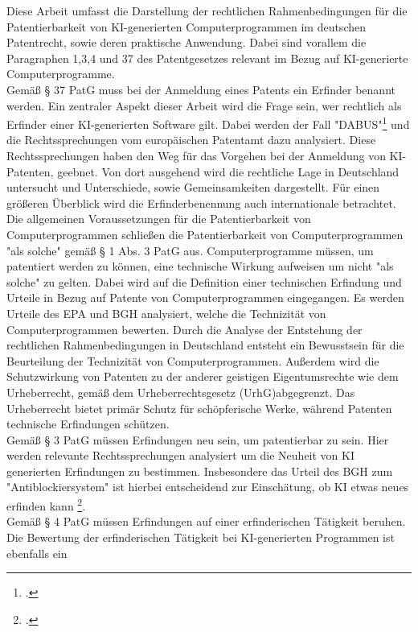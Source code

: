 Diese Arbeit umfasst die Darstellung der rechtlichen
Rahmenbedingungen für die Patentierbarkeit von KI-generierten
Computerprogrammen im deutschen Patentrecht, sowie deren
praktische Anwendung.
Dabei sind vorallem die Paragraphen 1,3,4 und 37 des Patentgesetzes relevant
im Bezug auf KI-generierte Computerprogramme.
\\
Gemäß § 37 PatG muss bei der Anmeldung eines Patents 
ein Erfinder benannt werden. 
Ein zentraler Aspekt dieser Arbeit wird die Frage sein, 
wer rechtlich als Erfinder einer KI-generierten Software gilt. 
Dabei werden der Fall "DABUS"\footcite{zivilsenatZB222024} und die Rechtssprechungen
vom europäischen Patentamt dazu analysiert. Diese Rechtssprechungen
haben den Weg für das Vorgehen bei der Anmeldung von KI-Patenten, geebnet. 
Von dort ausgehend 
wird die rechtliche Lage in Deutschland untersucht und
Unterschiede, sowie Gemeinsamkeiten dargestellt. Für einen größeren Überblick
wird die Erfinderbenennung auch internationale
betrachtet.
\\
Die allgemeinen Voraussetzungen 
für die Patentierbarkeit von Computerprogrammen
schließen die Patentierbarkeit von Computerprogrammen "als solche" 
gemäß § 1 Abs. 3 PatG aus. 
Computerprogramme müssen, um patentiert werden zu können,
eine technische Wirkung aufweisen um nicht "als solche" zu gelten.
Dabei wird auf die Definition einer technischen Erfindung und Urteile
in Bezug auf Patente von Computerprogrammen eingegangen. Es
werden Urteile des EPA und BGH analysiert, welche
die Technizität von Computerprogrammen bewerten.
Durch die Analyse der Entstehung der rechtlichen Rahmenbedingungen
in Deutschland entsteht ein Bewusstsein für die 
Beurteilung der Technizität von Computerprogrammen.
Außerdem wird die Schutzwirkung von Patenten  
zu der anderer geistigen Eigentumsrechte wie dem Urheberrecht, 
gemäß dem Urheberrechtsgesetz (UrhG)abgegrenzt.
Das Urheberrecht bietet primär Schutz für schöpferische Werke,
während Patenten technische Erfindungen schützen.
\\
Gemäß § 3 PatG müssen Erfindungen neu sein, 
um patentierbar zu sein. 
Hier werden relevante Rechtssprechungen 
analysiert um die Neuheit von KI generierten
Erfindungen zu bestimmen. Insbesondere das
Urteil des BGH zum "Antiblockiersystem" ist 
hierbei entscheidend zur Einschätung, ob KI
etwas neues erfinden kann \footcite{Bundesgerichtshof13051980}.
\\
Gemäß § 4 PatG müssen Erfindungen auf einer erfinderischen Tätigkeit beruhen. 
Die Bewertung der erfinderischen Tätigkeit 
bei KI-generierten Programmen ist ebenfalls ein
